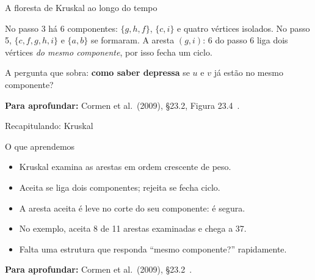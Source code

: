 \documentclass[aspectratio=169,xcolor=table]{beamer}
\newcommand{\arestasclrs}{a/b/4, a/h/8, b/c/8, b/h/11, c/d/7, c/f/4, c/i/2,
  d/e/9, d/f/14, e/f/10, f/g/2, g/h/1, g/i/6, h/i/7}
\newcommand{\grafoclrs}[3]{%
  \coordinate (a) at (0,0);     \coordinate (b) at (1,1);
  \coordinate (c) at (2.3,1);   \coordinate (d) at (3.6,1);
  \coordinate (e) at (4.6,0);   \coordinate (f) at (3.6,-1);
  \coordinate (g) at (2.3,-1);  \coordinate (h) at (1,-1);
  \coordinate (i) at (1.75,0);
  \foreach \u/\v/\w in \arestasclrs \draw[aresta] (\u) -- (\v);
  \def\lista{#1}\ifx\lista\empty\else
    \foreach \u/\v in {#1} \draw[arvore] (\u) -- (\v);\fi
  \def\lista{#3}\ifx\lista\empty\else
    \foreach \u/\v in {#3} \draw[rejeitada] (\u) -- (\v);\fi
  \foreach \u/\v/\w in \arestasclrs \path (\u) -- (\v) node[peso, pos=0.5] {\w};
  \foreach \v in {a,...,i} \node[vert] at (\v) {\v};
  \def\lista{#2}\ifx\lista\empty\else
    \foreach \v in {#2} \node[vdentro] at (\v) {\v};\fi
}
\newcommand{\fonte}[1]{%
  \vfill
  {\tiny\color{gray!55!black}\textbf{Para aprofundar:} #1\par}%
}
\begin{document}
\begin{frame}{A floresta de Kruskal ao longo do tempo}
  \begin{center}
  \end{center}
  \medskip
  {\small No passo 3 há 6 componentes: $\{g,h,f\}$, $\{c,i\}$ e quatro vértices isolados. No
  passo 5, $\{c,f,g,h,i\}$ e $\{a,b\}$ se formaram. A aresta $(g,i){:}\,6$ do passo 6 liga
  dois vértices \emph{do mesmo componente}, por isso fecha um ciclo.\par}
  \smallskip
  {\small A pergunta que sobra: \textbf{como saber depressa} se $u$ e $v$ já estão no mesmo
  componente?\par}
  \fonte{Cormen et al.\ (2009), \S 23.2, Figura 23.4~\cite{cormen2009introduction}.}
\end{frame}

\begin{frame}{Recapitulando: Kruskal}
  \begin{block}{O que aprendemos}
    \begin{itemize}
      \item Kruskal examina as arestas em ordem crescente de peso.
      \item Aceita se liga dois componentes; rejeita se fecha ciclo.
      \item A aresta aceita é leve no corte do seu componente: é segura.
      \item No exemplo, aceita 8 de 11 arestas examinadas e chega a 37.
      \item Falta uma estrutura que responda ``mesmo componente?'' rapidamente.
    \end{itemize}
  \end{block}
  \fonte{Cormen et al.\ (2009), \S 23.2~\cite{cormen2009introduction}.}
\end{frame}
\end{document}

